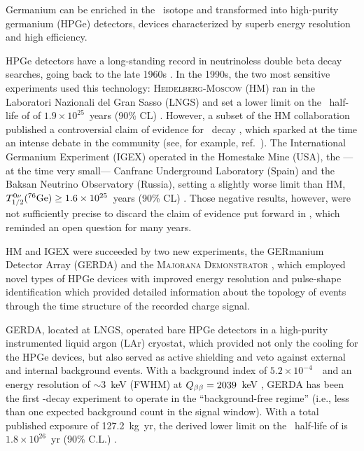 %
Germanium can be enriched in the \bb\ isotope and transformed into high-purity germanium (HPGe) detectors, devices characterized by superb energy resolution and high efficiency. 

HPGe detectors have a long-standing record in neutrinoless double beta decay searches, going back to the late 1960s \cite{Fiorini:1967in,Fiorini:1970}. In the 1990s, the two most sensitive experiments used this technology: \textsc{Heidelberg-Moscow} (HM) ran in the Laboratori Nazionali del Gran Sasso (LNGS) and set a lower limit on the \bbonu\ half-life of  of $1.9 \times 10^{25}$~years (90\% CL) \cite{Klapdor-Kleingrothaus:2000eir}. However, a subset of the HM collaboration published a controversial claim of evidence for \bbonu\ decay \cite{Klapdor-Kleingrothaus:2001oba, Klapdor-Kleingrothaus:2006zcr}, which sparked at the time an intense debate in the community (see, for example, ref.~\cite{Aalseth:2002dt}). The International Germanium Experiment (IGEX) operated in the Homestake Mine (USA), the ---at the time very small--- Canfranc Underground Laboratory (Spain) and the Baksan Neutrino Observatory (Russia), setting a slightly worse limit than HM, $T^{0\nu}_{1/2}(^{76}\mathrm{Ge}) \geq 1.6 \times 10^{25}$~years (90\% CL) \cite{IGEX:2002bce}. Those negative results, however, were not sufficiently precise to discard the claim of evidence put forward in \cite{Klapdor-Kleingrothaus:2001oba, Klapdor-Kleingrothaus:2006zcr}, which reminded an open question for many years. 

HM and IGEX were succeeded by two new experiments, the GERmanium Detector Array (GERDA) \cite{GERDA:2020xhi} and the \textsc{Majorana Demonstrator} \cite{Majorana:2022udl}, which employed novel types of HPGe devices with improved energy resolution and pulse-shape identification which provided detailed information about the topology of events through the time structure of the recorded charge signal.

GERDA, located at LNGS, operated bare HPGe detectors in a high-purity instrumented liquid argon (LAr) cryostat, which provided not only the cooling for the HPGe devices, but also served as active shielding and veto against external and internal background events. With a background index of $5.2\times10^{-4}$~\ckky\ and an energy resolution of $\sim3$~keV (FWHM) at $Q_{\beta\beta}=2039$~keV \cite{GERDA:2020xhi}, GERDA has been the first \bbonu-decay experiment to operate in the ``background-free regime'' (i.e., less than one expected background count in the signal window). With a total published exposure of 127.2~kg~yr, the derived lower limit on the \bbonu\ half-life of  is $1.8\times10^{26}$~yr (90\% C.L.) \cite{GERDA:2020xhi}. 

